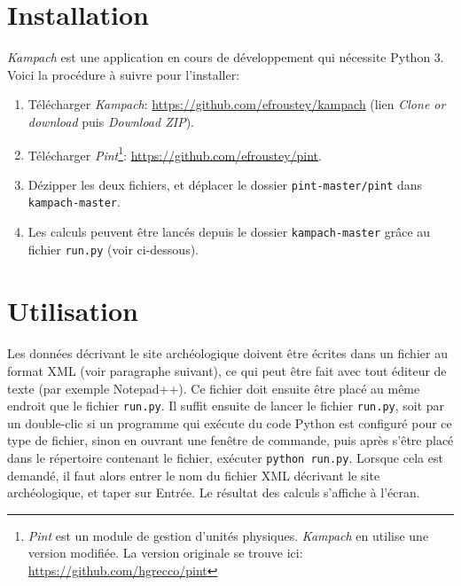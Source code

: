 \documentclass{article}
\begin{document}
\section{Installation}
\textit{Kampach} est une application en cours de développement qui nécessite Python 3. Voici la procédure à suivre pour l'installer:
\begin{enumerate}
 \item Télécharger \textit{Kampach}: \url{https://github.com/efroustey/kampach} (lien \textit{Clone or download} puis \textit{Download ZIP}).
 
 \item Télécharger \textit{Pint}\footnote{\textit{Pint} est un module de gestion d'unités physiques. \textit{Kampach} en utilise une version modifiée. La version originale se trouve ici: \url{https://github.com/hgrecco/pint}}: \url{https://github.com/efroustey/pint}.
 
 \item Dézipper les deux fichiers, et déplacer le dossier \texttt{pint-master/pint} dans \texttt{kampach-master}.
 
 \item Les calculs peuvent être lancés depuis le dossier \texttt{kampach-master} grâce au fichier \texttt{run.py} (voir ci-dessous).
\end{enumerate}

\section{Utilisation}

\paragraph{}
Les données décrivant le site archéologique doivent être écrites dans un fichier au format XML (voir paragraphe suivant), ce qui peut être fait avec tout éditeur de texte (par exemple Notepad++). Ce fichier doit ensuite être placé au même endroit que le fichier \texttt{run.py}. Il suffit ensuite de lancer le fichier \texttt{run.py}, soit par un double-clic si un programme qui exécute du code Python est configuré pour ce type de fichier, sinon en ouvrant une fenêtre de commande, puis après s'être placé dans le répertoire contenant le fichier, exécuter \texttt{python run.py}. Lorsque cela est demandé, il faut alors entrer le nom du fichier XML décrivant le site archéologique, et taper sur Entrée. Le résultat des calculs s'affiche à l'écran.
\end{document}
